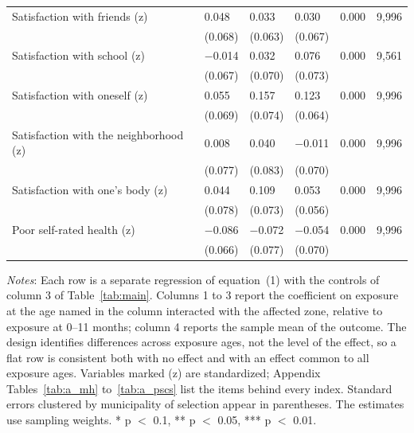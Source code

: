 \begin{table}[htbp]
\begin{minipage}{460pt}
{\begin{tabular*}{460pt}{@{}p{200pt}@{\extracolsep{\fill}}lllll@{}}
Satisfaction with friends (z) & 0.048 & 0.033 & 0.030 & 0.000 & 9,996 \\
 & (0.068) & (0.063) & (0.067) & & \\
Satisfaction with school (z) & $-$0.014 & 0.032 & 0.076 & 0.000 & 9,561 \\
 & (0.067) & (0.070) & (0.073) & & \\
Satisfaction with oneself (z) & 0.055 & 0.157\sym{**} & 0.123\sym{*} & 0.000 & 9,996 \\
 & (0.069) & (0.074) & (0.064) & & \\
Satisfaction with the neighborhood (z) & 0.008 & 0.040 & $-$0.011 & 0.000 & 9,996 \\
 & (0.077) & (0.083) & (0.070) & & \\
Satisfaction with one's body (z) & 0.044 & 0.109 & 0.053 & 0.000 & 9,996 \\
 & (0.078) & (0.073) & (0.056) & & \\
Poor self-rated health (z) & $-$0.086 & $-$0.072 & $-$0.054 & 0.000 & 9,996 \\
 & (0.066) & (0.077) & (0.070) & & \\
\bottomrule
\end{tabular*}\par}
\vspace{4pt}
{\footnotesize
\textit{Notes}: Each row is a separate regression of equation~(1) with the controls of column 3 of Table~\ref{tab:main}. Columns 1 to 3 report the coefficient on exposure at the age named in the column interacted with the affected zone, relative to exposure at 0--11 months; column 4 reports the sample mean of the outcome. The design identifies differences across exposure ages, not the level of the effect, so a flat row is consistent both with no effect and with an effect common to all exposure ages. Variables marked (z) are standardized; Appendix Tables~\ref{tab:a_mh} to~\ref{tab:a_pscs} list the items behind every index. Standard errors clustered by municipality of selection appear in parentheses. The estimates use sampling weights. * p $<$ 0.1, ** p $<$ 0.05, *** p $<$ 0.01.
\par}
\end{minipage}
\end{table}
